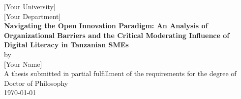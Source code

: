 \documentclass[12pt,oneside]{book}
\newcommand{\ThesisTitle}{Navigating the Open Innovation Paradigm: An Analysis of Organizational Barriers and the Critical Moderating Influence of Digital Literacy in Tanzanian SMEs}
\newcommand{\ThesisAuthor}{[Your Name]}
\newcommand{\ThesisDepartment}{[Your Department]}
\newcommand{\ThesisUniversity}{[Your University]}
\newcommand{\ThesisDegree}{Doctor of Philosophy}
\newcommand{\ThesisDate}{\today}
\begin{document}
\begin{titlepage}
  \centering
  {\Large \ThesisUniversity\\[1.5em]}
  {\large \ThesisDepartment\\[6em]}
  {\Huge \bfseries \ThesisTitle \\[1.2em]}
  {\large by \\[0.25em]}
  {\Large \ThesisAuthor \\[4em]}
  {\large A thesis submitted in partial fulfillment of the requirements for the degree of\\[0.25em]}
  {\large \ThesisDegree \\[6em]}
  {\large \ThesisDate}
\end{titlepage}

\frontmatter
{}

\cleardoublepage
{}


\cleardoublepage
\tableofcontents
\cleardoublepage
\listoffigures
\cleardoublepage
\listoftables

\mainmatter











\cleardoublepage
{}


\end{document}
